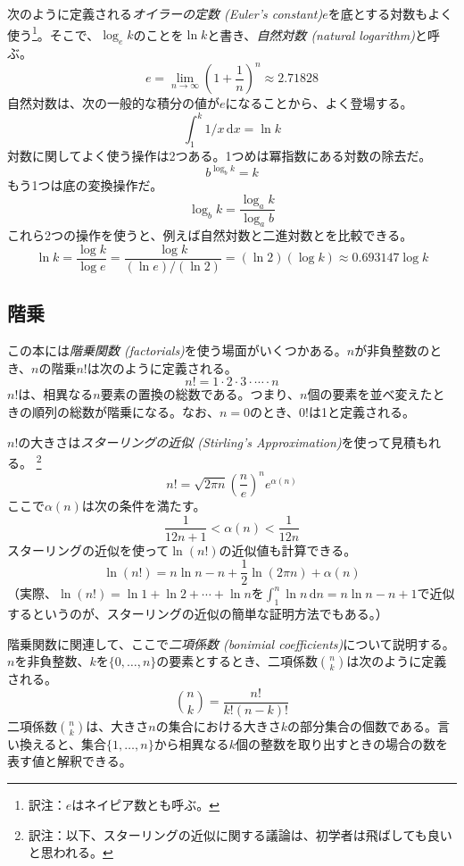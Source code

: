 %
%
次のように定義される\emph{オイラーの定数 (Euler's constant)}$e$を底とする対数もよく使う\footnote{訳注：$e$はネイピア数とも呼ぶ。}。そこで、$\log_e k$のことを$\ln k$と書き、\emph{自然対数 (natural logarithm)}と呼ぶ。%
%
\[
   e = \lim_{n\rightarrow\infty} \left(1+\frac{1}{n}\right)^n
   \approx  2.71828
\]
自然対数は、次の一般的な積分の値が$e$になることから、よく登場する。
\[
    \int_{1}^{k} 1/x\,\mathrm{d}x  = \ln k
\]
対数に関してよく使う操作は2つある。1つめは冪指数にある対数の除去だ。
\[
    b^{\log_b k} = k
\]
もう1つは底の変換操作だ。
\[
    \log_b k = \frac{\log_a k}{\log_a b}
\]
これら2つの操作を使うと、例えば自然対数と二進対数とを比較できる。
\[
   \ln k = \frac{\log k}{\log e} = \frac{\log k}{(\ln e)/(\ln 2)} =
    (\ln 2)(\log k) \approx 0.693147\log k
\]

\subsection{階乗}

この本には\emph{階乗関数 (factorials)}を使う場面がいくつかある。$n$が非負整数のとき、$n$の階乗$n!$は次のように定義される。
\[
   n! = 1\cdot2\cdot3\cdot\cdots\cdot n
\]
$n!$は、相異なる$n$要素の置換の総数である。つまり、$n$個の要素を並べ変えたときの順列の総数が階乗になる。なお、$n=0$のとき、$0!$は1と定義される。

%
$n!$の大きさは\emph{スターリングの近似 (Stirling's Approximation)}を使って見積もれる。
\footnote{訳注：以下、スターリングの近似に関する議論は、初学者は飛ばしても良いと思われる。}%
\[
  n!
   = \sqrt{2\pi n}\left(\frac{n}{e}\right)^{n}e^{\alpha(n)}
\]
ここで$\alpha(n)$は次の条件を満たす。
\[
   \frac{1}{12n+1} <  \alpha(n) < \frac{1}{12n}
\]
スターリングの近似を使って$\ln(n!)$の近似値も計算できる。
\[
   \ln(n!) = n\ln n - n + \frac{1}{2}\ln(2\pi n) + \alpha(n)
\]
（実際、$\ln(n!)=\ln 1 + \ln 2  + \cdots + \ln n$を$\int_1^n \ln n\,\mathrm{d}n = n\ln n - n +1$で近似するというのが、スターリングの近似の簡単な証明方法でもある。）

%
階乗関数に関連して、ここで\emph{二項係数 (bonimial coefficients)}について説明する。$n$を非負整数、$k$を$\{0,\ldots,n\}$の要素とするとき、二項係数$\binom{n}{k}$は次のように定義される。
\[
   \binom{n}{k} = \frac{n!}{k!(n-k)!}
\]
二項係数$\binom{n}{k}$は、大きさ$n$の集合における大きさ$k$の部分集合の個数である。言い換えると、集合$\{1,\ldots,n\}$から相異なる$k$個の整数を取り出すときの場合の数を表す値と解釈できる。 %

